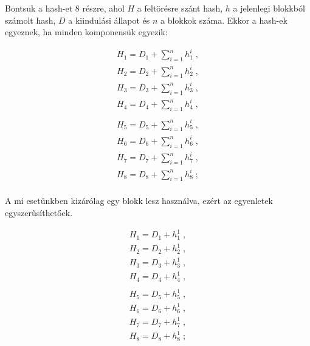 Bontsuk a hash-et 8 részre, ahol $H$ a feltörésre szánt hash, $h$ a jelenlegi blokkból számolt hash, $D$ a kiindulási állapot és $n$ a blokkok száma. Ekkor a hash-ek egyeznek, ha minden komponensük egyezik:
%
\begin{multicols}{2}
    \begin{equation*}
        \begin{split}
            H_1 = D_1 + \sum_{i=1}^{n} h_1^i \; , \\
            H_2 = D_2 + \sum_{i=1}^{n} h_2^i \; , \\
            H_3 = D_3 + \sum_{i=1}^{n} h_3^i \; , \\
            H_4 = D_4 + \sum_{i=1}^{n} h_4^i \; , \\
        \end{split}
    \end{equation*}
    \break
    \begin{equation*}
        \begin{split}
            H_5 = D_5 + \sum_{i=1}^{n} h_5^i \; , \\
            H_6 = D_6 + \sum_{i=1}^{n} h_6^i \; , \\
            H_7 = D_7 + \sum_{i=1}^{n} h_7^i \; , \\
            H_8 = D_8 + \sum_{i=1}^{n} h_8^i \; ; \\
        \end{split}
    \end{equation*}
\end{multicols}
%
A mi esetünkben kizárólag egy blokk lesz használva, ezért az egyenletek egyszerűsíthetőek.
%
\begin{multicols}{2}
    \begin{equation*}
        \begin{split}
            H_1 = D_1 + h_1^1 \; , \\
            H_2 = D_2 + h_2^1 \; , \\
            H_3 = D_3 + h_3^1 \; , \\
            H_4 = D_4 + h_4^1 \; , \\
        \end{split}
    \end{equation*}
    \break
    \begin{equation*}
        \begin{split}
            H_5 = D_5 + h_5^1 \; , \\
            H_6 = D_6 + h_6^1 \; , \\
            H_7 = D_7 + h_7^1 \; , \\
            H_8 = D_8 + h_8^1 \; ; \\
        \end{split}
    \end{equation*}
\end{multicols}
